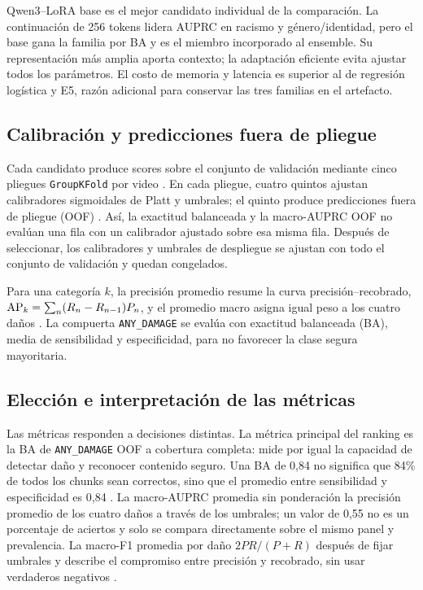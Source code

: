Qwen3--LoRA base es el mejor candidato individual de la comparación. La continuación de 256 tokens lidera AUPRC en racismo y género/identidad, pero el base gana la familia por BA y es el miembro incorporado al ensemble. Su representación más amplia aporta contexto; la adaptación eficiente evita ajustar todos los parámetros. El costo de memoria y latencia es superior al de regresión logística y E5, razón adicional para conservar las tres familias en el artefacto.

\subsection{Calibración y predicciones fuera de pliegue}

Cada candidato produce scores sobre el conjunto de validación mediante cinco pliegues \texttt{GroupKFold} por video \cite{sklearn2026groupkfold}. En cada pliegue, cuatro quintos ajustan calibradores sigmoidales de Platt y umbrales; el quinto produce predicciones fuera de pliegue (OOF) \cite{platt1999probabilistic,niculescu2005probabilities}. Así, la exactitud balanceada y la macro-AUPRC OOF no evalúan una fila con un calibrador ajustado sobre esa misma fila. Después de seleccionar, los calibradores y umbrales de despliegue se ajustan con todo el conjunto de validación y quedan congelados.

Para una categoría $k$, la precisión promedio resume la curva precisión--recobrado,
\(
\operatorname{AP}_k=\sum_n(R_n-R_{n-1})P_n
\), y el promedio macro asigna igual peso a los cuatro daños \cite{sklearn2026averageprecision,saito2015pr}. La compuerta \texttt{ANY\_DAMAGE} se evalúa con exactitud balanceada (BA), media de sensibilidad y especificidad, para no favorecer la clase segura mayoritaria.

\subsection{Elección e interpretación de las métricas}

Las métricas responden a decisiones distintas. La métrica principal del ranking es la BA de \texttt{ANY\_DAMAGE} OOF a cobertura completa: mide por igual la capacidad de detectar daño y reconocer contenido seguro. Una BA de 0,84 no significa que 84\% de todos los chunks sean correctos, sino que el promedio entre sensibilidad y especificidad es 0,84 \cite{brodersen2010balanced}. La macro-AUPRC promedia sin ponderación la precisión promedio de los cuatro daños a través de los umbrales; un valor de 0,55 no es un porcentaje de aciertos y solo se compara directamente sobre el mismo panel y prevalencia. La macro-F1 promedia por daño $2PR/(P+R)$ después de fijar umbrales y describe el compromiso entre precisión y recobrado, sin usar verdaderos negativos \cite{sokolova2009metrics}.

